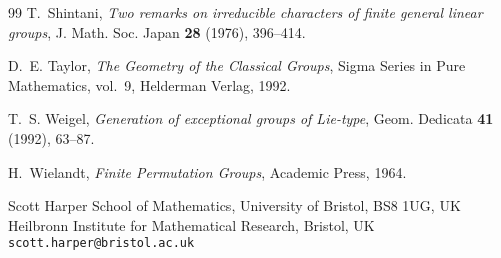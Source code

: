 \documentclass[11pt]{article}
\numberwithin{equation}{section}
\renewenvironment{thebibliography}[1]
{ \begin{oldthebibliography}{#1}
  \setlength{\parskip}{0pt}
  \setlength{\itemsep}{2pt plus 0.3ex}
  \bgroup\footnotesize }
{ \egroup \end{oldthebibliography} }
\theoremstyle{shdefinition}
\theoremstyle{shplain}
\newcommand{\<}{\langle}
\renewcommand{\>}{\rangle}
\renewcommand{\:}{\colon}
\begin{document}
\begin{thebibliography}{99}
T.~Shintani, \emph{Two remarks on irreducible characters of finite general
  linear groups}, J. Math. Soc. Japan \textbf{28} (1976), 396--414.

D.~E. Taylor, \emph{The Geometry of the Classical Groups}, Sigma Series in Pure
  Mathematics, vol.~9, Helderman Verlag, 1992.

T.~S. Weigel, \emph{Generation of exceptional groups of {L}ie-type}, Geom.
  Dedicata \textbf{41} (1992), 63--87.

H.~Wielandt, \emph{Finite Permutation Groups}, Academic Press, 1964.

\end{thebibliography}

\vspace{11pt}

\noindent Scott Harper \newline
School of Mathematics, University of Bristol,  BS8 1UG, UK \newline
Heilbronn Institute for Mathematical Research, Bristol, UK \newline
\texttt{scott.harper@bristol.ac.uk}
\end{document}
